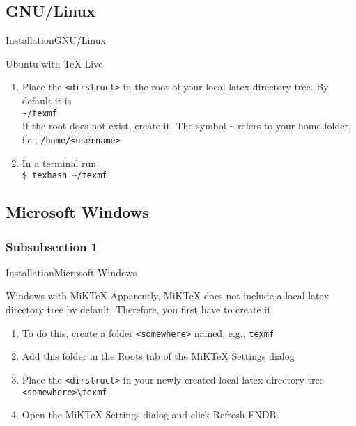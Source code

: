 \documentclass[10pt]{beamer}
\begin{document}
\subsection{GNU/Linux}
\begin{frame}{Installation}{GNU/Linux}
  \begin{block}{Ubuntu with TeX Live}
    \begin{enumerate}
      \item Place the {\tt <dirstruct>} in the root of your local latex directory tree. By default it is\\
        {\tt \textasciitilde /texmf}\\
        If the root does not exist, create it. The symbol {\tt \textasciitilde} refers to your home folder, i.e., {\tt /home/<username>}
      \item In a terminal run\\
        {\tt \$ texhash \textasciitilde /texmf}
    \end{enumerate}
  \end{block}
\end{frame}

\subsection{Microsoft Windows}
\subsubsection{Subsubsection 1}
\begin{frame}{Installation}{Microsoft Windows}
  \begin{block}{Windows with MiKTeX}
    Apparently, MiKTeX does not include a local latex directory tree by default. Therefore, you first have to create it.
    \begin{enumerate}
      \item To do this, create a folder {\tt <somewhere>} named, e.g., {\tt texmf}
      \item Add this folder in the Roots tab of the MiKTeX Settings dialog
      \item Place the {\tt <dirstruct>} in your newly created local latex directory tree\\
    {\tt <somewhere>\textbackslash texmf}\\
      \item Open the MiKTeX Settings dialog and click Refresh FNDB.
    \end{enumerate}
  \end{block}
\end{frame}
\end{document}
